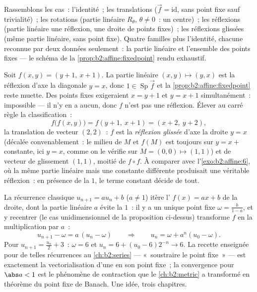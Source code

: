 \begin{remark}
Rassemblons les cas~: l'identité~; les translations ($\vec f =
\mathrm{id}$, sans point fixe sauf trivialité)~; les rotations
(partie linéaire $R_\theta$, $\theta \neq 0$~: un centre)~;
les réflexions (partie linéaire une réflexion, une droite de points
fixes)~; les réflexions glissées (même partie linéaire, sans point
fixe). Quatre familles plus l'identité, chacune reconnue par
deux données seulement~: la partie linéaire et l'ensemble des points
fixes --- le schéma de la \cref{prop:b2:affine:fixedpoint} rendu
exhaustif.
\end{remark}

\begin{example}\label{ex:b2:affine:glide}
Soit $f(x, y) = (y + 1,\ x + 1)$. La partie linéaire $(x, y)
\mapsto (y, x)$ est la réflexion d'axe la diagonale $y = x$, donc
$1 \in \operatorname{Sp}\vec f$ et
la \cref{prop:b2:affine:fixedpoint} reste muette. Des points fixes
exigeraient $x = y + 1$ et $y = x + 1$ simultanément~:
impossible --- il n'y en a aucun, donc $f$ n'est pas une réflexion.
Élever au carré règle la classification~:
\[
f\bigl(f(x, y)\bigr) = f(y + 1,\ x + 1) = (x + 2,\ y + 2),
\]
la translation de vecteur $(2, 2)$~: $f$ est la \emph{réflexion
glissée} d'axe la droite $y = x$ (décalée
convenablement~: le milieu de $M$ et $f(M)$ est toujours sur
$y = x + {}$constante, ici $y = x$, comme on le vérifie sur $M = (0,
0) \mapsto (1,1)$) et de vecteur de glissement $(1, 1)$, moitié de $f
\circ f$. À comparer avec l'\cref{exo:b2:affine:6}, où la même
partie linéaire mais une constante différente produisait une véritable
réflexion~: en présence de la  $1$, le terme constant
décide de tout.
\end{example}

\begin{example}\label{ex:b2:affine:recursion}
La récurrence classique $u_{n+1} = au_n + b$ ($a \neq 1$)
itère l' $f(x) = ax + b$ de la droite, dont la
partie linéaire $a$ évite la  $1$~: il y a un unique
point fixe $\omega = \frac{b}{1-a}$, et y recentrer
(le cas unidimensionnel de la proposition ci-dessus) transforme
$f$ en la multiplication par $a$~:
\[
u_{n+1} - \omega = a\,(u_n - \omega)
\qquad\Longrightarrow\qquad
u_n = \omega + a^n(u_0 - \omega) .
\]
Pour $u_{n+1} = \frac{u_n}2 + 3$~: $\omega = 6$ et $u_n = 6 +
(u_0 - 6)2^{-n} \to 6$. La recette enseignée pour de telles
récurrences au \cref{ch:b2:series} --- «~soustraire le point fixe~» ---
est exactement la vectorialisation d'une  en son
point fixe~; la convergence pour $\abs a < 1$ est le phénomène de
contraction que le \cref{ch:b2:metric} a transformé en théorème du
point fixe de Banach. Une idée, trois chapitres.
\end{example}

